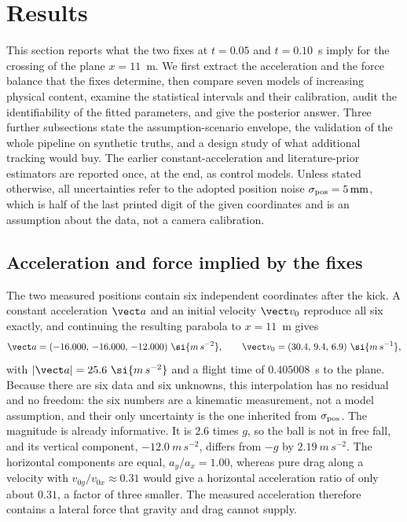 \section{Results}
\label{sec:results}

This section reports what the two fixes at $t=0.05$ and $t=0.10$~s imply for the
crossing of the plane $x=11$~m. We first extract the acceleration and the force
balance that the fixes determine, then compare seven models of increasing physical
content, examine the statistical intervals and their calibration, audit the
identifiability of the fitted parameters, and give the posterior answer. Three
further subsections state the assumption-scenario envelope, the validation of the
whole pipeline on synthetic truths, and a design study of what additional tracking
would buy. The earlier constant-acceleration and literature-prior estimators are
reported once, at the end, as control models. Unless stated otherwise, all
uncertainties refer to the adopted position noise $\sigma_{\rm pos}=\SI{5}{mm}$,
which is half of the last printed digit of the given coordinates and is an
assumption about the data, not a camera calibration.

\subsection{Acceleration and force implied by the fixes}
\label{sec:fixes}

The two measured positions contain six independent coordinates after the kick.
A constant acceleration $\vect a$ and an initial velocity $\vect v_0$ reproduce
all six exactly, and continuing the resulting parabola to $x=11$~m gives
\begin{equation}
  \vect a = (-16.000,\,-16.000,\,-12.000)~\si{m\,s^{-2}}, \qquad
  \vect v_0 = (30.4,\,9.4,\,6.9)~\si{m\,s^{-1}},
  \label{eq:m0numbers}
\end{equation}
with $|\vect a| = 25.6~\si{m\,s^{-2}}$ and a flight time of
$0.405008$~s to the plane. Because there are six data and six unknowns, this
interpolation has no residual and no freedom: the six numbers are a kinematic
measurement, not a model assumption, and their only uncertainty is the one
inherited from $\sigma_{\rm pos}$. The magnitude is already informative. It is
$2.6$ times $g$, so the ball is not in free fall, and its vertical component,
$-12.0~\si{m\,s^{-2}}$, differs from $-g$ by $2.19~\si{m\,s^{-2}}$. The horizontal
components are equal, $a_y/a_x=1.00$, whereas pure drag along a velocity with
$v_{0y}/v_{0x}\approx 0.31$ would give a horizontal acceleration ratio of only about
$0.31$, a factor of three smaller. The measured acceleration therefore contains a
lateral force that gravity
and drag cannot supply.

